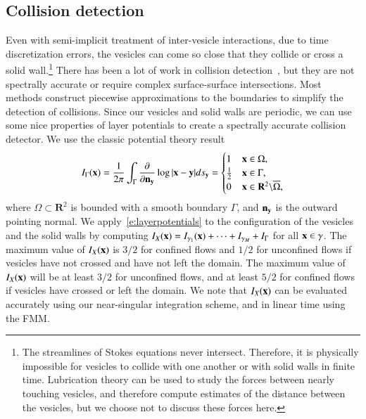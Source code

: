 \subsection{Collision detection}\label{s:collision}
Even with semi-implicit treatment of inter-vesicle interactions, due
to time discretization errors, the vesicles can come so close that they
collide or cross a solid wall.\footnote{The streamlines of Stokes
equations never intersect.  Therefore, it is physically impossible for
vesicles to collide with one another or with solid walls in finite
time.  Lubrication theory can be used to study the forces between
nearly touching vesicles, and therefore compute estimates of the
distance between the vesicles, but we choose not to discuss these
forces here.}  There has been a lot of work in collision
detection~\cite{jimenez-e13,redon-e04}, but they are not spectrally
accurate or require complex surface-surface intersections.  Most
methods construct piecewise approximations to the boundaries to
simplify the detection of collisions.  Since our vesicles and solid
walls are periodic, we can use some nice properties of layer potentials
to create a spectrally accurate collision detector.  We use the classic
potential theory result~\cite{kellogg}
\begin{align}
  I_{\Gamma}({\mathbf{x}}) = \frac{1}{2\pi}\int_{\Gamma}\frac{\partial }{\partial {\mathbf{n}}_{{\mathbf{y}}}}\log|{\mathbf{x}} - {\mathbf{y}}| ds_{{\mathbf{y}}} = 
  \begin{cases}
    1 & {\mathbf{x}} \in \Omega, \\ 
    \frac{1}{2} & {\mathbf{x}} \in \Gamma, \\ 
    0 & {\mathbf{x}} \in \mathbf{R}^{2} \backslash \overline{\Omega}, 
  \end{cases}
  \label{e:layerpotentials}
\end{align}
where $\Omega \subset \mathbf{R}^{2}$ is bounded with a smooth boundary
$\Gamma$, and ${\mathbf{n}}_{{\mathbf{y}}}$ is the outward pointing normal.  We
apply~\eqref{e:layerpotentials} to the configuration of the vesicles
and the solid walls by computing $I_{X}({\mathbf{x}}) = I_{\gamma_{1}}({\mathbf{x}}) +
\cdots + I_{\gamma_{M}} + I_{\Gamma}$ for all ${\mathbf{x}} \in \gamma$.  The
maximum value of $I_{X}({\mathbf{x}})$ is $3/2$ for confined flows and $1/2$ for
unconfined flows if vesicles have not crossed and have not left the
domain.  The maximum value of $I_{X}({\mathbf{x}})$ will be at least $3/2$ for
unconfined flows, and at least $5/2$ for confined flows if vesicles
have crossed or left the domain.  We note that $I_{X}({\mathbf{x}})$ can be
evaluated accurately using our near-singular integration scheme, and in
linear time using the FMM. 

